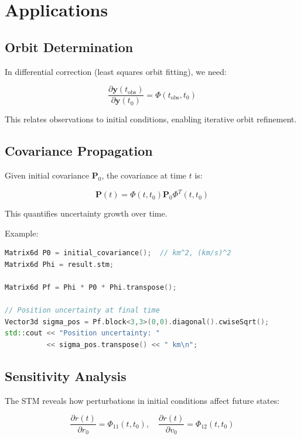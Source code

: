 \section{Applications}

\subsection{Orbit Determination}

In differential correction (least squares orbit fitting), we need:

\begin{equation}
    \frac{\partial\mathbf{y}(t_{\text{obs}})}{\partial\mathbf{y}(t_0)} = \Phi(t_{\text{obs}}, t_0)
\end{equation}

This relates observations to initial conditions, enabling iterative orbit refinement.

\subsection{Covariance Propagation}

Given initial covariance $\mathbf{P}_0$, the covariance at time $t$ is:

\begin{equation}
    \mathbf{P}(t) = \Phi(t, t_0) \mathbf{P}_0 \Phi^T(t, t_0)
\end{equation}

This quantifies uncertainty growth over time.

Example:
\begin{lstlisting}[language=C++,caption={Covariance propagation}]
Matrix6d P0 = initial_covariance();  // km^2, (km/s)^2
Matrix6d Phi = result.stm;

Matrix6d Pf = Phi * P0 * Phi.transpose();

// Position uncertainty at final time
Vector3d sigma_pos = Pf.block<3,3>(0,0).diagonal().cwiseSqrt();
std::cout << "Position uncertainty: " 
          << sigma_pos.transpose() << " km\n";
\end{lstlisting}

\subsection{Sensitivity Analysis}

The STM reveals how perturbations in initial conditions affect future states:

\begin{equation}
    \frac{\partial r(t)}{\partial r_0} = \Phi_{11}(t, t_0), \quad
    \frac{\partial r(t)}{\partial v_0} = \Phi_{12}(t, t_0)
\end{equation}

